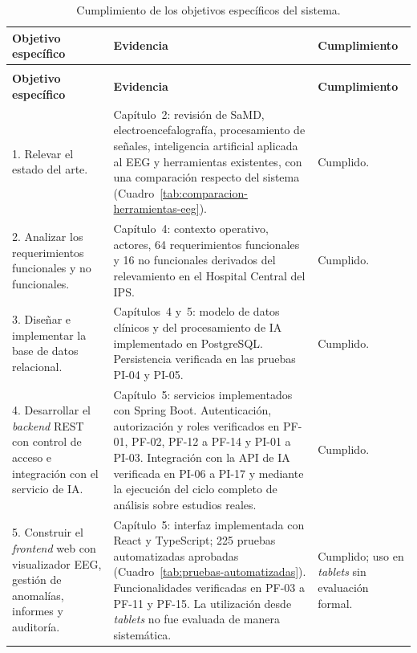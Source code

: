 \begin{longtable}{|
>{\raggedright\arraybackslash}p{}|
>{\raggedright\arraybackslash}p{}|
>{\raggedright\arraybackslash}p{}|}
\caption{Cumplimiento de los objetivos específicos del sistema.}
\label{tab:cumplimiento-objetivos}\\
\hline
\textbf{Objetivo específico} &
\textbf{Evidencia} &
\textbf{Cumplimiento} \\
\hline
\endfirsthead

\multicolumn{3}{c}{\textit{Continuación del Cuadro~\thetable}}\\
\hline
\textbf{Objetivo específico} &
\textbf{Evidencia} &
\textbf{Cumplimiento} \\
\hline
\endhead

1. Relevar el estado del arte. &
Capítulo~2: revisión de SaMD, electroencefalografía, procesamiento de señales, inteligencia artificial aplicada al EEG y herramientas existentes, con una comparación respecto del sistema (Cuadro~\ref{tab:comparacion-herramientas-eeg}). &
Cumplido. \\
\hline

2. Analizar los requerimientos funcionales y no funcionales. &
Capítulo~4: contexto operativo, actores, 64 requerimientos funcionales y 16 no funcionales derivados del relevamiento en el Hospital Central del IPS. &
Cumplido. \\
\hline

3. Diseñar e implementar la base de datos relacional. &
Capítulos~4 y~5: modelo de datos clínicos y del procesamiento de IA implementado en PostgreSQL.
Persistencia verificada en las pruebas PI-04 y PI-05. &
Cumplido. \\
\hline

4. Desarrollar el \textit{backend} REST con control de acceso e integración con el servicio de IA. &
Capítulo~5: servicios implementados con Spring Boot.
Autenticación, autorización y roles verificados en PF-01, PF-02, PF-12 a PF-14 y PI-01 a PI-03.
Integración con la API de IA verificada en PI-06 a PI-17 y mediante la ejecución del ciclo completo de análisis sobre estudios reales. &
Cumplido. \\
\hline

5. Construir el \textit{frontend} web con visualizador EEG, gestión de anomalías, informes y auditoría. &
Capítulo~5: interfaz implementada con React y TypeScript; 225 pruebas automatizadas aprobadas (Cuadro~\ref{tab:pruebas-automatizadas}).
Funcionalidades verificadas en PF-03 a PF-11 y PF-15.
La utilización desde \textit{tablets} no fue evaluada de manera sistemática. &
Cumplido; uso en \textit{tablets} sin evaluación formal. \\
\hline


\end{longtable}
